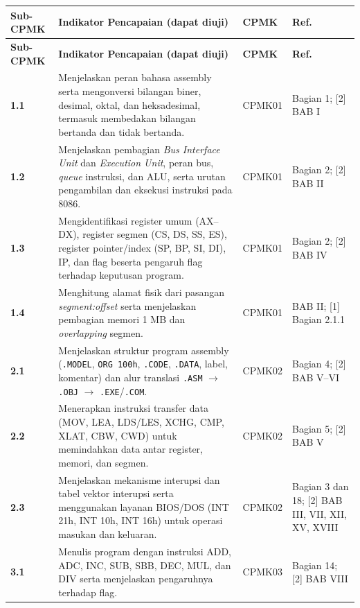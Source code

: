 \documentclass[12pt,a4paper]{article}
\begin{document}
\begin{longtable}{|>{\raggedright\arraybackslash}p{1.55cm}|>{\raggedright\arraybackslash}p{7.5cm}|>{\raggedright\arraybackslash}p{2.05cm}|>{\raggedright\arraybackslash}p{2.2cm}|}
\hline
\textbf{Sub-CPMK} & \textbf{Indikator Pencapaian (dapat diuji)} & \textbf{CPMK} & \textbf{Ref.} \\
\hline
\endfirsthead
\hline
\textbf{Sub-CPMK} & \textbf{Indikator Pencapaian (dapat diuji)} & \textbf{CPMK} & \textbf{Ref.} \\
\hline
\endhead
\hline
\endfoot

\textbf{1.1} & Menjelaskan peran bahasa assembly serta mengonversi bilangan biner, desimal, oktal, dan heksadesimal, termasuk membedakan bilangan bertanda dan tidak bertanda. & CPMK01 & [1] Bagian 1; [2] BAB I \\
\hline
\textbf{1.2} & Menjelaskan pembagian \textit{Bus Interface Unit} dan \textit{Execution Unit}, peran bus, \textit{queue} instruksi, dan ALU, serta urutan pengambilan dan eksekusi instruksi pada 8086. & CPMK01 & [1] Bagian 2; [2] BAB II \\
\hline
\textbf{1.3} & Mengidentifikasi register umum (AX--DX), register segmen (CS, DS, SS, ES), register pointer/index (SP, BP, SI, DI), IP, dan flag beserta pengaruh flag terhadap keputusan program. & CPMK01 & [1] Bagian 2; [2] BAB IV \\
\hline
\textbf{1.4} & Menghitung alamat fisik dari pasangan \textit{segment:offset} serta menjelaskan pembagian memori 1 MB dan \textit{overlapping} segmen. & CPMK01 & [2] BAB II; [1] Bagian 2.1.1 \\
\hline
\textbf{2.1} & Menjelaskan struktur program assembly (\texttt{.MODEL}, \texttt{ORG 100h}, \texttt{.CODE}, \texttt{.DATA}, label, komentar) dan alur translasi \texttt{.ASM} $\rightarrow$ \texttt{.OBJ} $\rightarrow$ \texttt{.EXE}/\texttt{.COM}. & CPMK02 & [1] Bagian 4; [2] BAB V--VI \\
\hline
\textbf{2.2} & Menerapkan instruksi transfer data (MOV, LEA, LDS/LES, XCHG, CMP, XLAT, CBW, CWD) untuk memindahkan data antar register, memori, dan segmen. & CPMK02 & [1] Bagian 5; [2] BAB V \\
\hline
\textbf{2.3} & Menjelaskan mekanisme interupsi dan tabel vektor interupsi serta menggunakan layanan BIOS/DOS (INT 21h, INT 10h, INT 16h) untuk operasi masukan dan keluaran. & CPMK02 & [1] Bagian 3 dan 18; [2] BAB III, VII, XII, XV, XVIII \\
\hline
\textbf{3.1} & Menulis program dengan instruksi ADD, ADC, INC, SUB, SBB, DEC, MUL, dan DIV serta menjelaskan pengaruhnya terhadap flag. & CPMK03 & [1] Bagian 14; [2] BAB VIII \\

\end{longtable}
\end{document}
